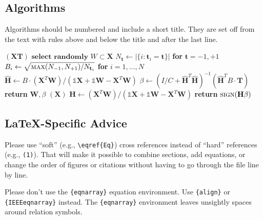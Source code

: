 \documentclass[journal,onecolumn,web]{ieeecolor}
\begin{document}
\subsection{Algorithms}
Algorithms should be numbered and include a short title.
They are set off from the text with rules above and below the title and after the last line.
\begin{algorithm}[H]
\caption{Weighted Tanimoto ELM.}\label{alg:alg1}
\begin{algorithmic}
\STATE 
{}$(\mathbf{X} \mathbf{T})$
\STATE \hspace{0.5cm}$ \textbf{select randomly } W \subset \mathbf{X}  $
\STATE \hspace{0.5cm}$ N_\mathbf{t} \gets | \{ i : \mathbf{t}_i = \mathbf{t} \} | $ \textbf{ for } $ \mathbf{t}= -1,+1 $
\STATE \hspace{0.5cm}$ B_i \gets \sqrt{ \textsc{max}(N_{-1},N_{+1}) / N_{\mathbf{t}_i} } $ \textbf{ for } $ i = 1,...,N $
\STATE \hspace{0.5cm}$ \hat{\mathbf{H}} \gets  B \cdot (\mathbf{X}^T\textbf{W})/( \mathbb{1}\mathbf{X} + \mathbb{1}\textbf{W} - \mathbf{X}^T\textbf{W} ) $
\STATE \hspace{0.5cm}$ \beta \gets \left ( I/C + \hat{\mathbf{H}}^T\hat{\mathbf{H}} \right )^{-1}(\hat{\mathbf{H}}^T B\cdot \mathbf{T})  $
\STATE \hspace{0.5cm}\textbf{return} $\textbf{W},  \beta $
\STATE 
{}$(\mathbf{X} )$
\STATE \hspace{0.5cm}$ \mathbf{H} \gets  (\mathbf{X}^T\textbf{W} )/( \mathbb{1}\mathbf{X}  + \mathbb{1}\textbf{W}- \mathbf{X}^T\textbf{W}  ) $
\STATE \hspace{0.5cm}\textbf{return}  $\textsc{sign}( \mathbf{H} \beta )$
\end{algorithmic}
\label{alg1}
\end{algorithm}
\subsection{\LaTeX-Specific Advice}

Please use ``soft'' (e.g., \verb|\eqref{Eq}|) cross references instead
of ``hard'' references (e.g., \verb|(1)|). That will make it possible
to combine sections, add equations, or change the order of figures or
citations without having to go through the file line by line.

Please don't use the \verb|{eqnarray}| equation environment. Use
\verb|{align}| or \verb|{IEEEeqnarray}| instead. The \verb|{eqnarray}|
environment leaves unsightly spaces around relation symbols.
\end{document}
